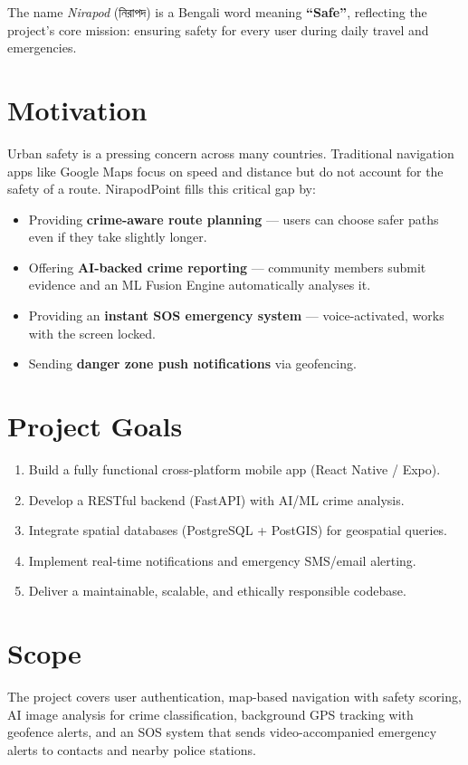 \documentclass[12pt,a4paper]{report}
\begin{document}
The name \textit{Nirapod} (নিরাপদ) is a Bengali word meaning \textbf{``Safe''}, reflecting the project's core mission: ensuring safety for every user during daily travel and emergencies.

\section{Motivation}
Urban safety is a pressing concern across many countries. Traditional navigation apps like Google Maps focus on speed and distance but do not account for the safety of a route. NirapodPoint fills this critical gap by:
\begin{itemize}[leftmargin=*]
    \item Providing \textbf{crime-aware route planning} — users can choose safer paths even if they take slightly longer.
    \item Offering \textbf{AI-backed crime reporting} — community members submit evidence and an ML Fusion Engine automatically analyses it.
    \item Providing an \textbf{instant SOS emergency system} — voice-activated, works with the screen locked.
    \item Sending \textbf{danger zone push notifications} via geofencing.
\end{itemize}

\section{Project Goals}
\begin{enumerate}[leftmargin=*]
    \item Build a fully functional cross-platform mobile app (React Native / Expo).
    \item Develop a RESTful backend (FastAPI) with AI/ML crime analysis.
    \item Integrate spatial databases (PostgreSQL + PostGIS) for geospatial queries.
    \item Implement real-time notifications and emergency SMS/email alerting.
    \item Deliver a maintainable, scalable, and ethically responsible codebase.
\end{enumerate}

\section{Scope}
The project covers user authentication, map-based navigation with safety scoring, AI image analysis for crime classification, background GPS tracking with geofence alerts, and an SOS system that sends video-accompanied emergency alerts to contacts and nearby police stations.
\end{document}
